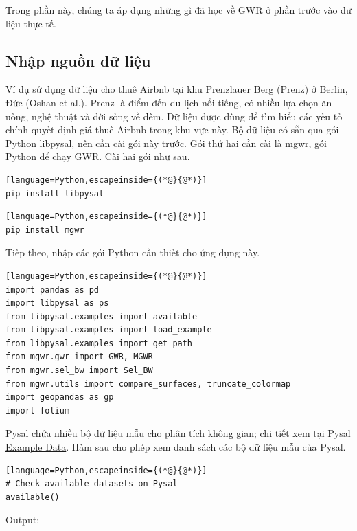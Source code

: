 Trong phần này, chúng ta áp dụng những gì đã học về GWR ở phần trước vào dữ liệu thực tế.

\subsection{Nhập nguồn dữ liệu}

Ví dụ sử dụng dữ liệu cho thuê Airbnb tại khu Prenzlauer Berg (Prenz) ở Berlin, Đức (Oshan et al.). Prenz là điểm đến du lịch nổi tiếng, có nhiều lựa chọn ăn uống, nghệ thuật và đời sống về đêm. Dữ liệu được dùng để tìm hiểu các yếu tố chính quyết định giá thuê Airbnb trong khu vực này. Bộ dữ liệu có sẵn qua gói Python libpysal, nên cần cài gói này trước. Gói thứ hai cần cài là mgwr, gói Python để chạy GWR. Cài hai gói như sau.

\begin{lstlisting}[language=Python,escapeinside={(*@}{@*)}]
pip install libpysal
\end{lstlisting}

\begin{lstlisting}[language=Python,escapeinside={(*@}{@*)}]
pip install mgwr
\end{lstlisting}

Tiếp theo, nhập các gói Python cần thiết cho ứng dụng này.

\begin{lstlisting}[language=Python,escapeinside={(*@}{@*)}]
import pandas as pd
import libpysal as ps
from libpysal.examples import available
from libpysal.examples import load_example
from libpysal.examples import get_path
from mgwr.gwr import GWR, MGWR
from mgwr.sel_bw import Sel_BW
from mgwr.utils import compare_surfaces, truncate_colormap
import geopandas as gp
import folium
\end{lstlisting}

Pysal chứa nhiều bộ dữ liệu mẫu cho phân tích không gian; chi tiết xem tại \href{https://pysal.org/notebooks/lib/libpysal/Example_Datasets.html\#Datasets-for-use-with-libpysal}{Pysal Example Data}. Hàm sau cho phép xem danh sách các bộ dữ liệu mẫu của Pysal.

\begin{lstlisting}[language=Python,escapeinside={(*@}{@*)}]
# Check available datasets on Pysal
available()
\end{lstlisting}

Output:

